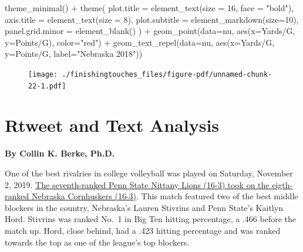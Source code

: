 \documentclass[
  letterpaper,
  DIV=11,
  numbers=noendperiod]{scrreprt}
\newenvironment{Shaded}{\begin{snugshade}}{\end{snugshade}}
\newcommand{\AttributeTok}[1]{\textcolor[rgb]{0.40,0.45,0.13}{#1}}
\newcommand{\DecValTok}[1]{\textcolor[rgb]{0.68,0.00,0.00}{#1}}
\newcommand{\FunctionTok}[1]{\textcolor[rgb]{0.28,0.35,0.67}{#1}}
\newcommand{\NormalTok}[1]{\textcolor[rgb]{0.00,0.23,0.31}{#1}}
\newcommand{\SpecialCharTok}[1]{\textcolor[rgb]{0.37,0.37,0.37}{#1}}
\newcommand{\StringTok}[1]{\textcolor[rgb]{0.13,0.47,0.30}{#1}}
\begin{document}
\begin{Shaded}
\begin{Highlighting}[]
  \FunctionTok{theme\_minimal}\NormalTok{() }\SpecialCharTok{+} 
  \FunctionTok{theme}\NormalTok{(}
    \AttributeTok{plot.title =} \FunctionTok{element\_text}\NormalTok{(}\AttributeTok{size =} \DecValTok{16}\NormalTok{, }\AttributeTok{face =} \StringTok{"bold"}\NormalTok{),}
    \AttributeTok{axis.title =} \FunctionTok{element\_text}\NormalTok{(}\AttributeTok{size =} \DecValTok{8}\NormalTok{), }
    \AttributeTok{plot.subtitle =} \FunctionTok{element\_markdown}\NormalTok{(}\AttributeTok{size=}\DecValTok{10}\NormalTok{), }
    \AttributeTok{panel.grid.minor =} \FunctionTok{element\_blank}\NormalTok{()}
\NormalTok{    ) }\SpecialCharTok{+}
  \FunctionTok{geom\_point}\NormalTok{(}\AttributeTok{data=}\NormalTok{nu, }\FunctionTok{aes}\NormalTok{(}\AttributeTok{x=}\StringTok{\textasciigrave{}}\AttributeTok{Yards/G}\StringTok{\textasciigrave{}}\NormalTok{, }\AttributeTok{y=}\StringTok{\textasciigrave{}}\AttributeTok{Points/G}\StringTok{\textasciigrave{}}\NormalTok{), }\AttributeTok{color=}\StringTok{"red"}\NormalTok{) }\SpecialCharTok{+} 
  \FunctionTok{geom\_text\_repel}\NormalTok{(}\AttributeTok{data=}\NormalTok{nu, }\FunctionTok{aes}\NormalTok{(}\AttributeTok{x=}\StringTok{\textasciigrave{}}\AttributeTok{Yards/G}\StringTok{\textasciigrave{}}\NormalTok{, }\AttributeTok{y=}\StringTok{\textasciigrave{}}\AttributeTok{Points/G}\StringTok{\textasciigrave{}}\NormalTok{, }\AttributeTok{label=}\StringTok{"Nebraska 2018"}\NormalTok{))}
\end{Highlighting}
\end{Shaded}

\begin{figure}[H]

{\centering \texttt{[image: ./finishingtouches\_files/figure-pdf/unnamed-chunk-22-1.pdf]}

}

\end{figure}


\hypertarget{rtweet-and-text-analysis}{%
\chapter{Rtweet and Text Analysis}\label{rtweet-and-text-analysis}}

\textbf{By Collin K. Berke, Ph.D.}

One of the best rivalries in college volleyball was played on Saturday,
November 2, 2019.
\href{https://journalstar.com/sports/huskers/volleyball/john-cook-on-the-radio-nebraska-penn-state-match-will/article_c1d5c426-e136-5ef2-b589-510a0f17da82.html}{The
seventh-ranked Penn State Nittany Lions (16-3) took on the eigth-ranked
Nebraska Cornhuskers (16-3)}. This match featured two of the best middle
blockers in the country, Nebraska's Lauren Stivrins and Penn State's
Kaitlyn Hord. Stivrins was ranked No.~1 in Big Ten hitting percentage, a
.466 before the match up. Hord, close behind, had a .423 hitting
percentage and was ranked towards the top as one of the league's top
blockers.
\end{document}
